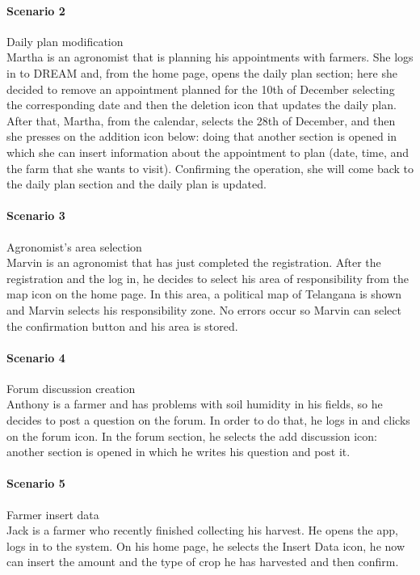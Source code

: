 \paragraph{Scenario 2} Daily plan modification\\
Martha is an agronomist that is planning his appointments with farmers. She logs in to DREAM and, from the home page,
opens the daily plan section; here she decided to remove an appointment planned for the 10th of December selecting the
corresponding date and then the deletion icon that updates the daily plan. After that, Martha, from the calendar,
selects the 28th of December, and then she presses on the addition icon below: doing that another section is opened in
which she can insert information about the appointment to plan (date, time, and the farm that she wants to visit).
Confirming the operation, she will come back to the daily plan section and the daily plan is updated.

\paragraph{Scenario 3} Agronomist's area selection\\
Marvin is an agronomist that has just completed the registration. After the registration and the log in,
he decides to select his area of responsibility from the map icon on the home page. In this area, a political map of
Telangana is shown and Marvin selects his responsibility zone. No errors occur so Marvin can select the confirmation
button and his area is stored.

\paragraph{Scenario 4} Forum discussion creation\\
Anthony is a farmer and has problems with soil humidity in his fields, so he decides to post a question on the forum.
In order to do that, he logs in and clicks on the forum icon. In the forum section, he selects the add discussion icon:
another section is opened in which he writes his question and post it.

\paragraph{Scenario 5} Farmer insert data\\
Jack is a farmer who recently finished collecting his harvest. He opens the app, logs in to the system. On his home page, 
he selects the Insert Data icon, he now can insert the amount and the type of crop he has harvested and then confirm.


